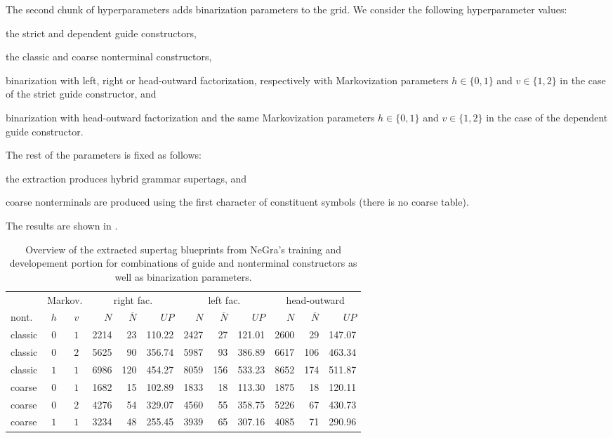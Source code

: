 \documentclass[../../document.tex]{subfiles}
\begin{document}
    The second chunk of hyperparameters adds binarization parameters to the grid.
    We consider the following hyperparameter values:
    \begin{compactitem}
        \item the strict and dependent guide constructors,
        \item the classic and coarse nonterminal constructors,
        \item binarization with left, right or head-outward factorization, respectively with Markovization parameters \(h \in \{0,1\}\) and \(v \in \{1,2\}\) in the case of the strict guide constructor, and
        \item binarization with head-outward factorization and the same Markovization parameters \(h \in \{0,1\}\) and \(v \in \{1,2\}\) in the case of the dependent guide constructor.
    \end{compactitem}
    The rest of the parameters is fixed as follows:
    \begin{compactitem}
        \item the extraction produces hybrid grammar supertags, and
        \item coarse nonterminals are produced using the first character of constituent symbols (there is no coarse table).
    \end{compactitem}
    The results are shown in .
    
    \begin{table}
        \caption{\label{tbl:gridsearch:2:1}
            Overview of the extracted supertag blueprints from NeGra's training and developement portion for combinations of guide and nonterminal constructors as well as binarization parameters.
        }
        \centering
        \vspace{.2cm}
        \begin{tabular}{lcc|rrr|rrr|rrr}
            \toprule
& \multicolumn{2}{c|}{Markov.}         & \multicolumn{3}{c|}{right fac.} & \multicolumn{3}{c|}{left fac.} & \multicolumn{3}{c}{head-outward}  \\
nont.  & \(h\) &\(v\)        & $N$ & $\overline{N}$ & $\mathit{UP}$ & $N$ & $\overline{N}$ & $\mathit{UP}$ & $N$ & $\overline{N}$ & $\mathit{UP}$  \\ \hline
classic & \(0\) & \(1\)    & 2214 & 23 & 110.22 & 2427 & 27 & 121.01 & 2600 & 29 & 147.07  \\
classic & \(0\) & \(2\)    & 5625 & 90 & 356.74 & 5987 & 93 & 386.89 & 6617 & 106 & 463.34  \\
classic & \(1\) & \(1\)    & 6986 & 120 & 454.27 & 8059 & 156 & 533.23 & 8652 & 174 & 511.87 \\\hline
coarse  & \(0\) & \(1\)    & 1682 & 15 & 102.89 & 1833 & 18 & 113.30 & 1875 & 18 & 120.11  \\
coarse  & \(0\) & \(2\)    & 4276 & 54 & 329.07 & 4560 & 55 & 358.75 & 5226 & 67 & 430.73  \\
coarse  & \(1\) & \(1\)    & 3234 & 48 & 255.45 & 3939 & 65 & 307.16 & 4085 & 71 & 290.96 \\
\bottomrule
        \end{tabular}
    \end{table}
\end{document}
